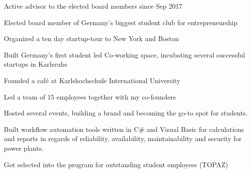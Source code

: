\documentclass[]{deedy-resume-openfont}
\begin{document}
\begin{minipage}[t]{0.66\textwidth}
\begin{tightemize}
\item Active advisor to the elected board members since Sep 2017
\item Elected board member of Germany's biggest student club for entrepreneurship
\item Organized a ten day startup-tour to New York and Boston
\item Built Germany's first student led Co-working space, incubating several successful startups in Karlsruhe
\end{tightemize}
\sectionsep

\begin{tightemize}
\item Founded a café at Karlshochschule International University
\item Led a team of 15 employees together with my co-founders
\item Hosted several events, building a brand and becoming the go-to spot for students.
\end{tightemize}
\sectionsep

\begin{tightemize}
\item Built workflow automation tools written in C$\#$ and Visual Basic for calculations and reports in regards of reliability, availability, maintainability and security for power plants.
\item Got selected into the program for outstanding student employees (TOPAZ)
\end{tightemize}
\sectionsep



\end{minipage}
\end{document}
